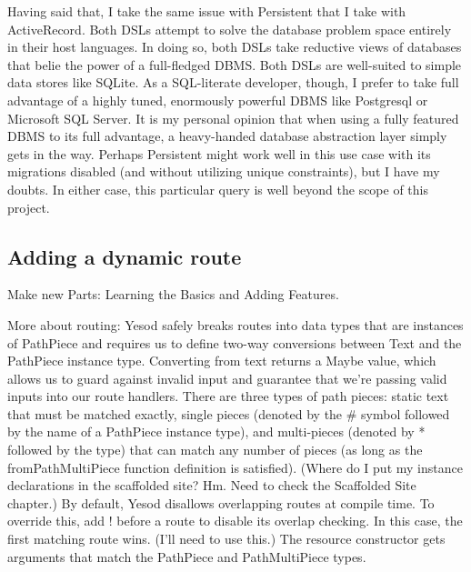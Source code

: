 Having said that, I take the same issue with Persistent that I take with ActiveRecord. Both DSLs attempt to solve the database problem space entirely in their host languages. In doing so, both DSLs take reductive views of databases that belie the power of a full-fledged DBMS. Both DSLs are well-suited to simple data stores like SQLite. As a SQL-literate developer, though, I prefer to take full advantage of a highly tuned, enormously powerful DBMS like Postgresql or Microsoft SQL Server. It is my personal opinion that when using a fully featured DBMS to its full advantage, a heavy-handed database abstraction layer simply gets in the way. Perhaps Persistent might work well in this use case with its migrations disabled (and without utilizing unique constraints), but I have my doubts. In either case, this particular query is well beyond the scope of this project.

\subsection{Adding a dynamic route}


Make new Parts: Learning the Basics and Adding Features.

More about routing:
  Yesod safely breaks routes into data types that are instances of PathPiece and requires us to define two-way conversions between Text and the PathPiece instance type. Converting from text returns a Maybe value, which allows us to guard against invalid input and guarantee that we're passing valid inputs into our route handlers.
  There are three types of path pieces: static text that must be matched exactly, single pieces (denoted by the \# symbol followed by the name of a PathPiece instance type), and multi-pieces (denoted by * followed by the type) that can match any number of pieces (as long as the fromPathMultiPiece function definition is satisfied). (Where do I put my instance declarations in the scaffolded site? Hm. Need to check the Scaffolded Site chapter.)
  By default, Yesod disallows overlapping routes at compile time. To override this, add ! before a route to disable its overlap checking. In this case, the first matching route wins. (I'll need to use this.)
  The resource constructor gets arguments that match the PathPiece and PathMultiPiece types.

